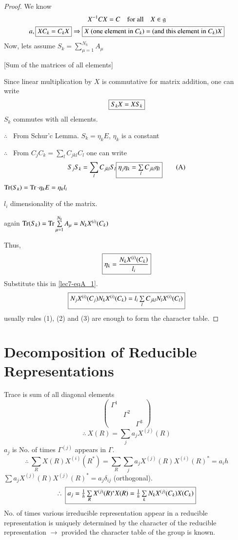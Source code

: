 \begin{proof}
We know
\begin{gather*}
X^{-1}CX=C\quad\text{for all}\quad X\in \mathfrak{g}\\
a, \fbox{$XC_{k}=C_{k}X$}\Rightarrow \fbox{$X$ (one element in $C_{k}$) = (and this element in $C_{k}$)$X$}
\end{gather*}
Now, lets assume $S_{k}=\sum\limits^{N_{k}}_{\mu=1}A_{\mu}$ 

[Sum of the matrices of all elements]

Since linear multiplication by $X$ is commutative for matrix addition, one can write
$$
\fbox{$S_{k}X=XS_{k}$}
$$
$S_{k}$ commutes with all elements.

$\therefore$ \ From Schur'c Lemma. $S_{k}=\eta_{k}E$, $\eta_{k}$ is a constant

$\therefore$ \ From $C_{j}C_{k}=\sum\limits_{l}C_{jkl}C_{l}$ one can write
\begin{equation*}
S_{j}S_{k}=\sum\limits_{l}C_{jkl}S_{l} \fbox{$\eta_{j}\eta_{k}=\sum\limits_{l}C_{jkl}\eta_{l}$}\tag{A}\label{lec7-eqA_1}
\end{equation*}
$\operatorname{Tr}(S_{k})=\operatorname{Tr}\cdot \eta_{k}E=\eta_{k}l_{i}$

$l_{i}$ dimensionality of the matrix.

again $\operatorname{Tr}(S_{k})=\operatorname{Tr}\sum\limits^{N_{k}}_{\mu=1}A_{\mu}=N_{k}X^{(i)}(C_{k})$

Thus,
$$
\fbox{$\eta_{k}=\dfrac{N_{k}X^{(i)}(C_{k})}{l_{i}}$}
$$
Substitute this in \eqref{lec7-eqA_1}.
$$
\fbox{$N_{j}X^{(i)}(C_{j})N_{k}X^{(i)}(C_{k})=l_{i}\sum\limits_{l}C_{jkl}N_{l}X^{(i)}(C_{l})$}
$$
usually rules (1), (2) and (3) are enough to form the character table.
\end{proof}

\section*{Decomposition of Reducible Representations}

Trace is sum of all diagonal elements
$$
\left(
\begin{matrix}
\Gamma^{1} & & \\
 & \Gamma^{2} & \\
 & & \Gamma^{3}
\end{matrix}
\right)
$$
$$
\therefore \ X(R)=\sum\limits_{j}a_{j}X^{(j)}(R)
$$
$a_{j}$ is No. of times $\Gamma^{(j)}$ appears in $\Gamma$.
$$
\therefore \ \sum\limits_{R}X(R)X^{(i)}(R^{*})=\sum\limits_{R}\sum\limits_{j}a_{j}X^{(j)}(R)X^{(i)}(R)^{*}=a_{i}h
$$
$\sum a_{j}X^{(j)}(R)X^{(j)}(R)^{*}=a_{j}\delta_{ij}$ (orthogonal).
$$
\therefore \ \fbox{$a_{j}=\frac{1}{h}\sum\limits_{R}X^{(j)}(R)^{*}X(R)=\frac{1}{h}\sum\limits_{k}N_{k}X^{(j)}(C_{k})X(C_{k})$}
$$
No. of times various irreducible representation appear in a reducible representation is uniquely determined by the character of the reducible representation $\to$ provided the character table of the group is known.

